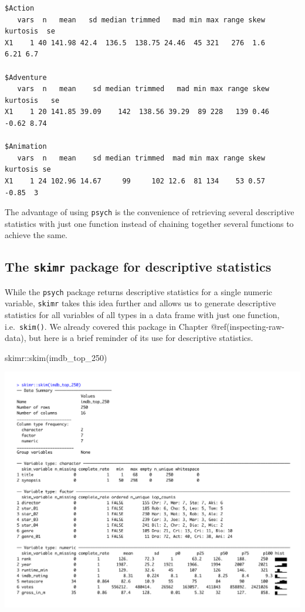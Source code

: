 \documentclass[
  letterpaper,
]{krantz}
\makeatletter
\newenvironment{Shaded}{\begin{snugshade}}{\end{snugshade}}
\newcommand{\FunctionTok}[1]{\textcolor[rgb]{0.28,0.35,0.67}{#1}}
\newcommand{\NormalTok}[1]{\textcolor[rgb]{0.00,0.23,0.31}{#1}}
\newcommand{\SpecialCharTok}[1]{\textcolor[rgb]{0.37,0.37,0.37}{#1}}
\newenvironment{kframe}{%
\medskip{}
\setlength{\fboxsep}{.8em}
 \def\at@end@of@kframe{}%
 \ifinner\ifhmode%
  \def\at@end@of@kframe{\end{minipage}}%
  \begin{minipage}{\columnwidth}%
 \fi\fi%
 \def\FrameCommand##1{\hskip\@totalleftmargin \hskip-\fboxsep
 \colorbox{shadecolor}{##1}\hskip-\fboxsep
     \hskip-\linewidth \hskip-\@totalleftmargin \hskip\columnwidth}%
 \MakeFramed {\advance\hsize-\width
   \@totalleftmargin\z@ \linewidth\hsize
   \@setminipage}}%
 {\par\unskip\endMakeFramed%
 \at@end@of@kframe}
\renewenvironment{Shaded}{\begin{kframe}}{\end{kframe}}
\makeatother
\begin{document}
\begin{verbatim}
$Action
   vars  n   mean   sd median trimmed   mad min max range skew kurtosis  se
X1    1 40 141.98 42.4  136.5  138.75 24.46  45 321   276  1.6     6.21 6.7

$Adventure
   vars  n   mean    sd median trimmed   mad min max range skew kurtosis   se
X1    1 20 141.85 39.09    142  138.56 39.29  89 228   139 0.46    -0.62 8.74

$Animation
   vars  n   mean    sd median trimmed  mad min max range skew kurtosis se
X1    1 24 102.96 14.67     99     102 12.6  81 134    53 0.57    -0.85  3
\end{verbatim}

The advantage of using \texttt{psych} is the convenience of retrieving
several descriptive statistics with just one function instead of
chaining together several functions to achieve the same.

\subsection{\texorpdfstring{The \texttt{skimr} package for descriptive
statistics}{The skimr package for descriptive statistics}}\label{sec-skimr-package}

While the \texttt{psych} package returns descriptive statistics for a
single numeric variable, \texttt{skimr} takes this idea further and
allows us to generate descriptive statistics for all variables of all
types in a data frame with just one function, i.e.~\texttt{skim()}. We
already covered this package in Chapter @ref(inspecting-raw-data), but
here is a brief reminder of its use for descriptive statistics.

\begin{Shaded}
\begin{Highlighting}[]
\NormalTok{skimr}\SpecialCharTok{::}\FunctionTok{skim}\NormalTok{(imdb\_top\_250)}
\end{Highlighting}
\end{Shaded}

\includegraphics{images/chapter_08_img/output_skim.png}
\end{document}
